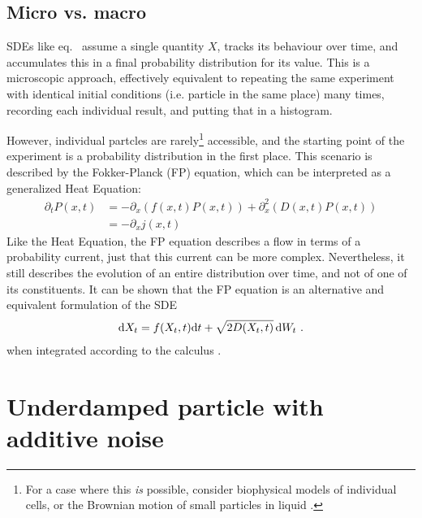 \subsection{Micro vs. macro}
\label{sec:fp introduction}

SDEs like eq.~ assume a single quantity \(X\), tracks its behaviour over time, and accumulates this in a final probability distribution for its value. This is a microscopic approach, effectively equivalent to repeating the same experiment with identical initial conditions (i.e. particle in the same place) many times, recording each individual result, and putting that in a histogram.

However, individual partcles are rarely\footnote{For a case where this \emph{is} possible, consider biophysical models of individual cells, or the Brownian motion of small particles in liquid \cite{sengupta}.} accessible, and the starting point of the experiment is a probability distribution in the first place. This scenario is described by the Fokker-Planck (FP) equation, which can be interpreted as a generalized Heat Equation:
%
\begin{equation}
	\label{eqn:fp}
	\begin{split}
	\partial_tP(x,t)
	&= - \partial_x (f(x,t)P(x,t)) + \partial_x^2 (D(x,t)P(x,t)) \\
	&= -\partial_xj(x,t)
	\end{split}
\end{equation}
%
Like the Heat Equation, the FP equation describes a flow in terms of a probability current, just that this current can be more complex. Nevertheless, it still describes the evolution of an entire distribution over time, and not of one of its constituents. It can be shown that the FP equation is an alternative and equivalent formulation of the SDE
%
\begin{align}
	\mathrm{d} X_t = f(X_t,t)\mathrm{d} t + \sqrt{2 D(X_t,t)}\,\mathrm{d} W_t ~.
\end{align}
%
when integrated according to the \Ito{} calculus \cite{sde}.




\section{Underdamped particle with additive noise}
\label{sec:underdamped-model}

